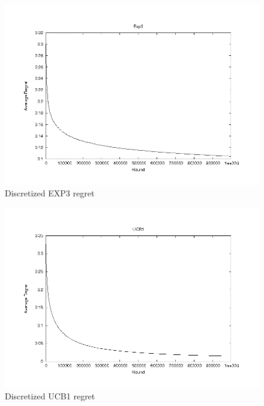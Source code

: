 \documentclass{article}
\begin{document}
\begin{figure}[h!]
  \begin{center}
     \includegraphics[width=\figwidth]{images/exp3.png}
     \caption{Discretized EXP3 regret}
     \label{fig:exp3}
  \end{center}
\end{figure}

\begin{figure}[h!]
  \begin{center}
     \includegraphics[width=\figwidth]{images/ucb1.png}
     \caption{Discretized UCB1 regret}
     \label{fig:ucb1}
  \end{center}
\end{figure}
\end{document}
